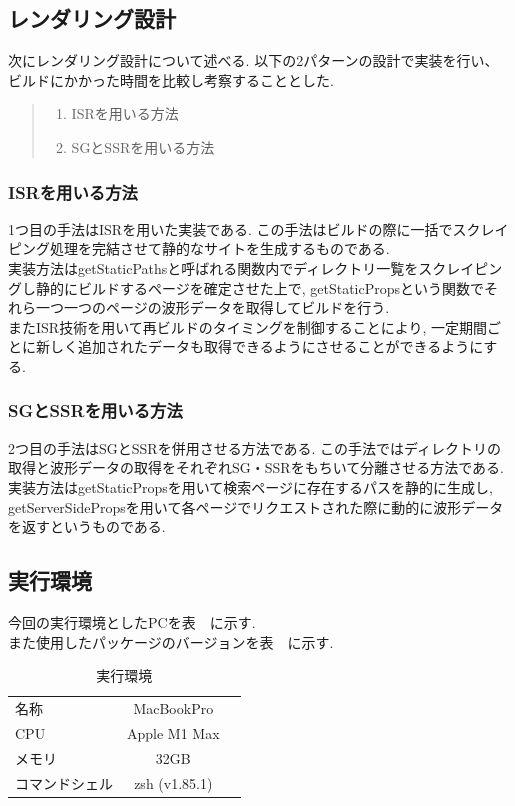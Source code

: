 \subsection{レンダリング設計}
次にレンダリング設計について述べる.
以下の2パターンの設計で実装を行い、ビルドにかかった時間を比較し考察することとした.
\begin{quote}
	\begin{enumerate}
		\item ISRを用いる方法
		\item SGとSSRを用いる方法
	\end{enumerate}
\end{quote}
\subsubsection{ISRを用いる方法}
1つ目の手法はISRを用いた実装である.
この手法はビルドの際に一括でスクレイピング処理を完結させて静的なサイトを生成するものである.\\
実装方法はgetStaticPathsと呼ばれる関数内でディレクトリ一覧をスクレイピングし静的にビルドするページを確定させた上で, getStaticPropsという関数でそれら一つ一つのページの波形データを取得してビルドを行う.\\
またISR技術を用いて再ビルドのタイミングを制御することにより, 一定期間ごとに新しく追加されたデータも取得できるようにさせることができるようにする.

\subsubsection{SGとSSRを用いる方法}
2つ目の手法はSGとSSRを併用させる方法である.
この手法ではディレクトリの取得と波形データの取得をそれぞれSG・SSRをもちいて分離させる方法である.
実装方法はgetStaticPropsを用いて検索ページに存在するパスを静的に生成し, getServerSidePropsを用いて各ページでリクエストされた際に動的に波形データを返すというものである.

\subsection{実行環境}
今回の実行環境としたPCを表　に示す.\\
また使用したパッケージのバージョンを表　に示す.

\begin{table}[hbtp]
	\caption{実行環境}
	\label{table:data_type}
	\centering
	\begin{tabular}{lcr}
		\hline
		名称      & MacBookPro    \\
		CPU     & Apple M1 Max  \\
		メモリ     & 32GB          \\
		コマンドシェル & zsh (v1.85.1) \\
		\hline
	\end{tabular}
\end{table}


